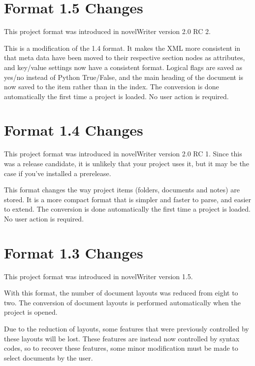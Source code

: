 \documentclass[a4paper,11pt,english]{sphinxmanual}
\begin{document}
\section{Format 1.5 Changes}
\label{\detokenize{more_projectformat:format-1-5-changes}}\label{\detokenize{more_projectformat:a-prjfmt-1-5}}
\sphinxAtStartPar
This project format was introduced in novelWriter version 2.0 RC 2.

\sphinxAtStartPar
This is a modification of the 1.4 format. It makes the XML more consistent in that meta data have
been moved to their respective section nodes as attributes, and key/value settings now have a
consistent format. Logical flags are saved as yes/no instead of Python True/False, and the main
heading of the document is now saved to the item rather than in the index. The conversion is done
automatically the first time a project is loaded. No user action is required.


\section{Format 1.4 Changes}
\label{\detokenize{more_projectformat:format-1-4-changes}}\label{\detokenize{more_projectformat:a-prjfmt-1-4}}
\sphinxAtStartPar
This project format was introduced in novelWriter version 2.0 RC 1. Since this was a release
candidate, it is unlikely that your project uses it, but it may be the case if you’ve installed a
pre\sphinxhyphen{}release.

\sphinxAtStartPar
This format changes the way project items (folders, documents and notes) are stored. It is a more
compact format that is simpler and faster to parse, and easier to extend. The conversion is done
automatically the first time a project is loaded. No user action is required.


\section{Format 1.3 Changes}
\label{\detokenize{more_projectformat:format-1-3-changes}}\label{\detokenize{more_projectformat:a-prjfmt-1-3}}
\sphinxAtStartPar
This project format was introduced in novelWriter version 1.5.

\sphinxAtStartPar
With this format, the number of document layouts was reduced from eight to two. The conversion of
document layouts is performed automatically when the project is opened.

\sphinxAtStartPar
Due to the reduction of layouts, some features that were previously controlled by these layouts
will be lost. These features are instead now controlled by syntax codes, so to recover these
features, some minor modification must be made to select documents by the user.
\end{document}
